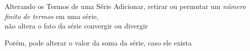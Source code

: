 \begin{frame}{Alterando os Termos de uma Série}
  Adicionar, retirar ou permutar um \emph{número finito de termos} em uma série,\\
  não altera o fato da série convergir ou divergir

  \pause
  \vspace{\baselineskip}
  Porém, pode alterar o valor da soma da série, caso ele exista
\end{frame}

\begin{frame}{\contentsname}
  \tableofcontents
\end{frame}


